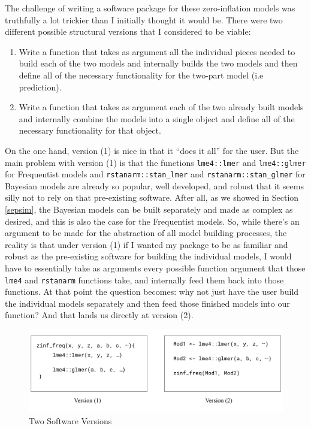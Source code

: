 \documentclass[12pt,twoside]{reedthesis}
\providecommand{\tightlist}{%
  \setlength{\itemsep}{0pt}\setlength{\parskip}{0pt}}
\begin{document}
The challenge of writing a software package for these zero-inflation models was truthfully a lot trickier than I initially thought it would be. There were two different possible structural versions that I considered to be viable:
\begin{enumerate}
\def\labelenumi{\arabic{enumi}.}
\tightlist
\item
  Write a function that takes as argument all the individual pieces needed to build each of the two models and internally builds the two models and then define all of the necessary functionality for the two-part model (i.e prediction).
\item
  Write a function that takes as argument each of the two already built models and internally combine the models into a single object and define all of the necessary functionality for that object.
\end{enumerate}
On the one hand, version (1) is nice in that it ``does it all'' for the user. But the main problem with version (1) is that the functions \texttt{lme4::lmer} and \texttt{lme4::glmer} for Frequentist models and \texttt{rstanarm::stan\_lmer} and \texttt{rstanarm::stan\_glmer} for Bayesian models are already so popular, well developed, and robust that it seems silly not to rely on that pre-existing software. After all, as we showed in Section \ref{sepsim}, the Bayesian models can be built separately and made as complex as desired, and this is also the case for the Frequentist models. So, while there's an argument to be made for the abstraction of all model building processes, the reality is that under version (1) if I wanted my package to be as familiar and robust as the pre-existing software for building the individual models, I would have to essentially take as arguments every possible function argument that those \texttt{lme4} and \texttt{rstanarm} functions take, and internally feed them back into those functions. At that point the question becomes: why not just have the user build the individual models separately and then feed those finished models into our function? And that lands us directly at version (2).
\begin{figure}

{\centering \includegraphics[width=0.9\linewidth]{figure/v1v2} 

}

\caption{Two Software Versions}\label{fig:tbl2}
\end{figure}
\end{document}
